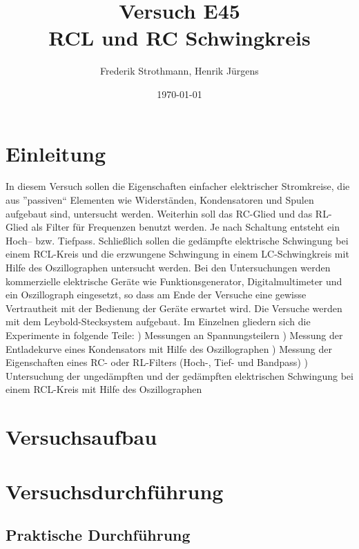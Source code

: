 \documentclass[12pt]{scrartcl}
\title{Versuch E45\\ RCL und RC Schwingkreis}
\author{Frederik Strothmann, Henrik Jürgens}
\date{\today}
\begin{document}

\maketitle
\tableofcontents
\newpage


\section{Einleitung}

In diesem Versuch sollen die Eigenschaften einfacher elektrischer Stromkreise, die aus ”passiven“ Elementen wie
Widerständen, Kondensatoren und Spulen aufgebaut sind, untersucht werden. Weiterhin soll das RC-Glied und das
RL-Glied als Filter für Frequenzen benutzt werden. Je nach Schaltung entsteht ein Hoch– bzw. Tiefpass. Schließlich sollen die gedämpfte elektrische Schwingung bei einem RCL-Kreis und die erzwungene Schwingung
in einem LC-Schwingkreis mit Hilfe des Oszillographen untersucht werden. Bei den Untersuchungen werden kommerzielle elektrische Geräte wie Funktionsgenerator, Digitalmultimeter und ein Oszillograph eingesetzt, so dass am Ende der Versuche eine gewisse Vertrautheit mit der Bedienung der Geräte erwartet wird. Die Versuche werden mit dem Leybold-Stecksystem aufgebaut. Im Einzelnen gliedern sich die Experimente in folgende Teile:
)
Messungen an Spannungsteilern
)
Messung der Entladekurve eines Kondensators mit Hilfe des Oszillographen
)
Messung der Eigenschaften eines RC- oder RL-Filters (Hoch-, Tief- und Bandpass)
)
Untersuchung der ungedämpften und der gedämpften elektrischen Schwingung bei einem RCL-Kreis mit Hilfe des Oszillographen

\section{Versuchsaufbau}


\section{Versuchsdurchführung}


\subsection{Praktische Durchführung}
\end{document}
